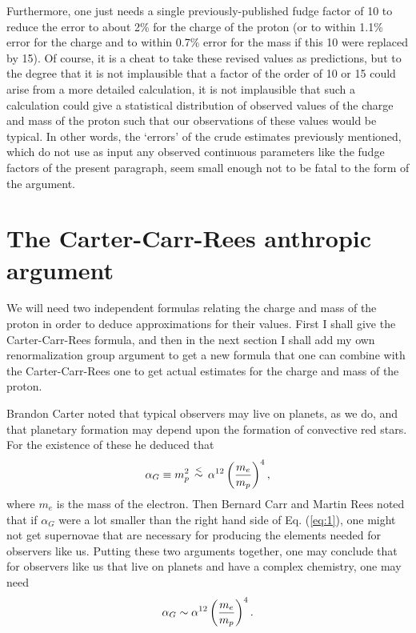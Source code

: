 \documentclass[a4paper,12pt]{article}
\begin{document}
	Furthermore, one just needs a single previously-published fudge
factor of 10 to reduce the error to about 2\% for the charge of the proton
(or to within 1.1\% error for the charge
and to within 0.7\% error for the mass if this 10 were replaced by 15).
Of course, it is a cheat
to take these revised values as predictions,
but to the degree that it is not implausible that a factor
of the order of 10 or 15 could arise from a more detailed calculation,
it is not implausible that such a calculation could give
a statistical distribution of observed values of the
charge and mass of the proton
such that our observations of these values would be typical.
In other words, the `errors' of the crude estimates
previously mentioned,
which do not use as input any observed continuous parameters
like the fudge factors of the present paragraph,
seem small enough not to be fatal to the form of the argument. 

\section{The Carter-Carr-Rees anthropic argument}

	We will need two independent formulas relating
the charge and mass of the proton in order to deduce
approximations for their values.  First I shall give
the Carter-Carr-Rees formula,
and then in the next section I shall add my own renormalization
group argument to get a new formula that one can combine
with the Carter-Carr-Rees one to get actual estimates
for the charge and mass of the proton.

	Brandon Carter \cite{Carter} noted that typical observers
may live on planets, as we do, and that planetary formation
may depend upon the formation of convective red stars.
For the existence of these he deduced that
 \begin{equation}
 \alpha_G \equiv m_p^2 \, \stackrel{<}{\sim} \,
  \alpha^{12}\left({m_e\over m_p}\right)^4,
 \label{eq:1}
 \end{equation}
where $m_e$ is the mass of the electron.
Then Bernard Carr and Martin Rees \cite{Carr-Rees}
noted that if $\alpha_G$ were a lot smaller than the
right hand side of Eq. (\ref{eq:1}),
one might not get supernovae that are necessary
for producing the elements needed for observers like us.
Putting these two arguments together,
one may conclude that for observers like us
that live on planets and have a complex chemistry,
one may need
 \begin{equation}
 \alpha_G \sim \alpha^{12}\left({m_e\over m_p}\right)^4.
 \label{eq:2}
 \end{equation}
 
\end{document}
